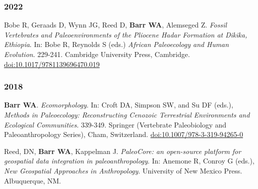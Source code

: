 \subsubsection*{2022}

\item Bobe R, Geraads D, Wynn JG, Reed D, {\bfseries Barr WA}, Alemseged Z. \emph{Fossil Vertebrates and Paleoenvironments of the Pliocene Hadar Formation at Dikika, Ethiopia}. In: Bobe R, Reynolds S (eds.) \emph{African Paleoecology and Human Evolution}. 229-241. Cambridge University Press, Cambridge. \href{https://doi.org/10.1017/9781139696470.019}{doi:10.1017/9781139696470.019}

\subsubsection*{2018}


\item {\bfseries Barr WA}. \emph{Ecomorphology}. In: Croft DA, Simpson SW, and Su DF (eds.), \emph{Methods in Paleoecology: Reconstructing Cenozoic Terrestrial Environments and Ecological Communities}. 339-349. Springer (Vertebrate Paleobiology and Paleoanthropology Series), Cham, Switzerland. \href{https://doi.org/10.1007/978-3-319-94265-0}{doi:10.1007/978-3-319-94265-0}

\item  Reed, DN, {\bfseries Barr WA}, Kappelman J. \emph{PaleoCore: an open-source platform for geospatial data integration in paleoanthropology}. In: Anemone R, Conroy G (eds.), \emph{New Geospatial Approaches in Anthropology}. University of New Mexico Press. Albuquerque, NM.